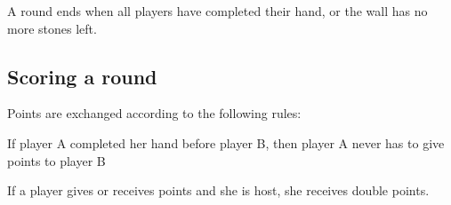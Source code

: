 \documentclass{article}
\begin{document}
A round ends when all players have completed their hand, or the wall has no more stones left.

\subsection{Scoring a round}
Points are exchanged according to the following rules:
\begin{itemize*}
    \item If player A completed her hand before player B, then player A never has to give points to player B
    \item If a player gives or receives points and she is host, she receives double points.
\end{itemize*}
\end{document}
